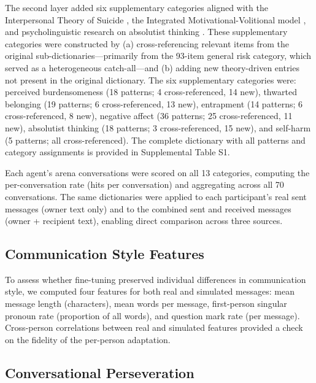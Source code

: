 \documentclass[review,12pt,authoryear]{elsarticle}
\begin{document}
The second layer added six supplementary categories aligned with the Interpersonal Theory of Suicide \citep{vanorden2010interpersonal}, the Integrated Motivational-Volitional model \citep{oconnor2011integrated}, and psycholinguistic research on absolutist thinking \citep{almosaiwi2018absolute}. These supplementary categories were constructed by (a) cross-referencing relevant items from the original sub-dictionaries---primarily from the 93-item general risk category, which served as a heterogeneous catch-all---and (b) adding new theory-driven entries not present in the original dictionary. The six supplementary categories were: perceived burdensomeness (18 patterns; 4 cross-referenced, 14 new), thwarted belonging (19 patterns; 6 cross-referenced, 13 new), entrapment (14 patterns; 6 cross-referenced, 8 new), negative affect (36 patterns; 25 cross-referenced, 11 new), absolutist thinking (18 patterns; 3 cross-referenced, 15 new), and self-harm (5 patterns; all cross-referenced). The complete dictionary with all patterns and category assignments is provided in Supplemental Table S1.

Each agent's arena conversations were scored on all 13 categories, computing the per-conversation rate (hits per conversation) and aggregating across all 70 conversations. The same dictionaries were applied to each participant's real sent messages (owner text only) and to the combined sent and received messages (owner + recipient text), enabling direct comparison across three sources.

\subsection{Communication Style Features}

To assess whether fine-tuning preserved individual differences in communication style, we computed four features for both real and simulated messages: mean message length (characters), mean words per message, first-person singular pronoun rate (proportion of all words), and question mark rate (per message). Cross-person correlations between real and simulated features provided a check on the fidelity of the per-person adaptation.

\subsection{Conversational Perseveration}
\end{document}
